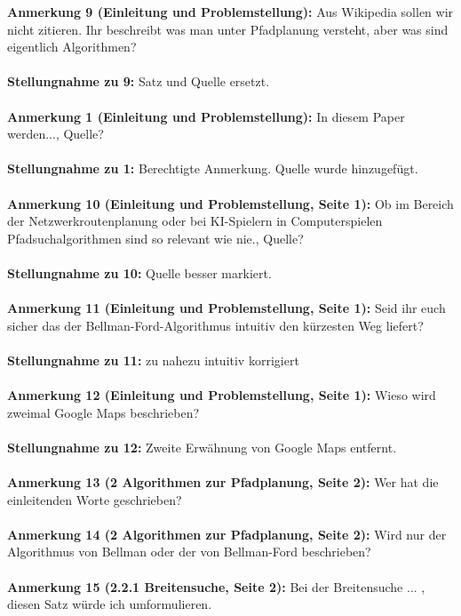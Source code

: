 \documentclass[a4paper,12pt]{book}
\begin{document}
\textbf{Anmerkung 9 (Einleitung und Problemstellung):}
Aus Wikipedia sollen wir nicht zitieren. Ihr beschreibt was man unter Pfadplanung versteht, aber was sind eigentlich Algorithmen?
\\ \\
\textbf{Stellungnahme zu 9:}
Satz und Quelle ersetzt.
\\ \\
\textbf{Anmerkung 1 (Einleitung und Problemstellung):}
\glqq In diesem Paper werden...\grqq, Quelle?
\\ \\
\textbf{Stellungnahme zu 1:}
Berechtigte Anmerkung. Quelle wurde hinzugefügt.
\\ \\
\textbf{Anmerkung 10 (Einleitung und Problemstellung, Seite 1):}
\glqq Ob im Bereich der Netzwerkroutenplanung oder bei KI-Spielern in Computerspielen Pfadsuchalgorithmen sind so relevant wie nie.\grqq, Quelle? 
\\ \\
\textbf{Stellungnahme zu 10:}
Quelle besser markiert.
\\ \\
\textbf{Anmerkung 11 (Einleitung und Problemstellung, Seite 1):}
Seid ihr euch sicher das der Bellman-Ford-Algorithmus \glqq intuitiv\grqq{} den kürzesten Weg liefert?
\\ \\
\textbf{Stellungnahme zu 11:}
zu \glqq nahezu intuitiv \grqq korrigiert
\\ \\
\textbf{Anmerkung 12 (Einleitung und Problemstellung, Seite 1):}
Wieso wird zweimal Google Maps beschrieben? 
\\ \\
\textbf{Stellungnahme zu 12:}
Zweite Erwähnung von Google Maps entfernt.
\\ \\
\textbf{Anmerkung 13 (2 Algorithmen zur Pfadplanung, Seite 2):}
Wer hat die einleitenden Worte geschrieben?
\\ \\
\textbf{Anmerkung 14 (2 Algorithmen zur Pfadplanung, Seite 2):}
Wird nur der Algorithmus von Bellman oder der von Bellman-Ford beschrieben?
\\ \\
\textbf{Anmerkung 15 (2.2.1 Breitensuche, Seite 2):}
\grqq Bei der Breitensuche ... \glqq, diesen Satz würde ich umformulieren.
\\ \\
\end{document}

